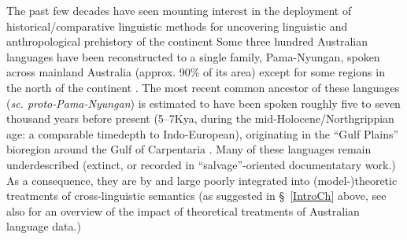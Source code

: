 \documentclass[12pt,dvipsnames]{report}
\begin{document}
The past few decades have seen mounting interest in the deployment of historical/comparative linguistic methods for uncovering linguistic and anthropological prehistory of the continent \citetext{\citealp[see][]{McConvell2011} for an overview.} Some three hundred Australian languages have been reconstructed to a single family, Pama-Nyungan, spoken across mainland Australia (approx. 90\% of its area) except for some regions in the north of the continent \citep{Dixon1980,Bowern2021}. The most recent common ancestor of these languages (\textit{sc. proto-Pama-Nyungan}) is estimated to have been spoken roughly five to seven thousand years before present (5--7Kya, during the mid-Holocene/Northgrippian age: a comparable timedepth to Indo-European), originating in the ``Gulf Plains'' bioregion around the Gulf of Carpentaria \citetext{\citet{Bouckaert2018}, supporting earlier work, incl. \citealp{Hale1964} a.o.}. Many of these languages remain underdescribed (extinct, or recorded in ``salvage''-oriented documentatary work.) As a consequence, they are by and large poorly integrated into (model-)theoretic treatments of cross-linguistic semantics (as suggested in \S~\ref{IntroCh} above, see also \citealp{Nordlinger2021} for an overview of the impact of theoretical treatments of Australian language data.)
\end{document}

